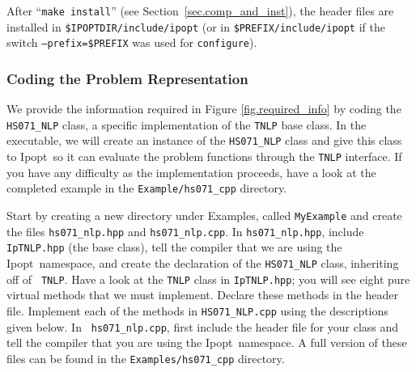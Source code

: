 \documentclass[letter,10pt]{article}
\newcommand{\Ipopt}{{\sc Ipopt}}
\begin{document}
After ``\texttt{make install}'' (see Section~\ref{sec.comp_and_inst}),
the header files are installed in \texttt{\$IPOPTDIR/include/ipopt}
(or in \texttt{\$PREFIX/include/ipopt} if the switch
\texttt{--prefix=\$PREFIX} was used for {\tt configure}).

\subsubsection{Coding the Problem Representation}\label{sec.cpp_problem}
We provide the information required in Figure \ref{fig.required_info}
by coding the {\tt HS071\_NLP} class, a specific implementation of the
{\tt TNLP} base class. In the executable, we will create an instance
of the {\tt HS071\_NLP} class and give this class to \Ipopt\ so it can
evaluate the problem functions through the {\tt TNLP} interface. If
you have any difficulty as the implementation proceeds, have a look at
the completed example in the {\tt Example/hs071\_cpp} directory.

Start by creating a new directory under Examples, called {\tt MyExample} and
create the files {\tt hs071\_nlp.hpp} and {\tt hs071\_nlp.cpp}. In
{\tt hs071\_nlp.hpp}, include {\tt IpTNLP.hpp} (the base class), tell
the compiler that we are using the \Ipopt\ namespace, and create the
declaration of the {\tt HS071\_NLP} class, inheriting off of {\tt
  TNLP}. Have a look at the {\tt TNLP} class in {\tt IpTNLP.hpp}; you
will see eight pure virtual methods that we must implement. Declare
these methods in the header file.  Implement each of the methods in
{\tt HS071\_NLP.cpp} using the descriptions given below. In {\tt
  hs071\_nlp.cpp}, first include the header file for your class and
tell the compiler that you are using the \Ipopt\ namespace. A full
version of these files can be found in the {\tt Examples/hs071\_cpp}
directory.
\end{document}
